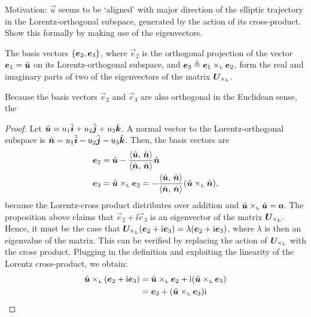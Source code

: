 Motivation: $\vec{u}$ seems to be `aligned' with major direction of the elliptic trajectory in the Lorentz-orthogonal subspace, generated by the action of its cross-product. Show this formally by making use of the eigenvectors.

The basis vectors $ \qty{\vec{e}_2, \vec{e}_3}$, where $\vec{e}_2$ is the orthogonal projection of the vector $\vec{e}_1 = \uvec{u}$ on its Lorentz-orthogonal subspace, and $\vec{e}_3 \triangleq \lorcrossp{\vec{e}_1}{\vec{e}_2}$, form the real and imaginary parts of two of the eigenvectors of the matrix $\mat{U}_{\lorcrossp{}{}}$. 

Because the basis vectors $\vec{e}_2$ and $\vec{e}_3$ are also orthogonal in the Euclidean sense, the 

\begin{proof}
    Let $\uvec{u} = u_1\uvec{i} + u_2\uvec{j} + u_3\uvec{k}$. A normal vector to the Lorentz-orthogonal subspace is $
    \uvec{n} = u_1\uvec{i} - u_2\uvec{j} - u_3\uvec{k}$. Then, the basis vectors are
    \begin{equation}
        \begin{split}
            \vec{e}_2 &= 
            \uvec{u} - \frac{ \inner{\uvec{u}}{\uvec{n}} }{ \inner{\uvec{n}}{\uvec{n}} } \uvec{n} \\
            \vec{e}_3 &= \lorcrossp{\uvec{u}}{\vec{e}_2} = -\frac{ \inner{\uvec{u}}{\uvec{n}} }{ \inner{\uvec{n}}{\uvec{n}} } \qty(\lorcrossp{\uvec{u}}{\uvec{n}}),
        \end{split}
    \end{equation}
    because the Lorentz-cross product distributes over addition and $\lorcrossp{\uvec{u}}{\uvec{u}} = \vec{0}$. The proposition above claims that $\vec{e}_2 + \ii\vec{e}_3$ is an eigenvector of the matrix $\mat{U}_{\lorcrossp{}{}}$. Hence, it must be the case that $\mat{U}_{\lorcrossp{}{}}(\vec{e}_2 + \ii\vec{e}_3) = \lambda(\vec{e}_2 + \ii\vec{e}_3)$, where $\lambda$ is then an eigenvalue of the matrix. This can be verified by replacing the action of $\mat{U}_{\lorcrossp{}{}}$ with the cross product. Plugging in the definition and exploiting the linearity of the Lorentz cross-product, we obtain:
    \begin{equation*}
        \begin{split}
            \lorcrossp{\uvec{u}}{\qty(\vec{e}_2 + \ii\vec{e}_3)} 
            &= \lorcrossp{\uvec{u}}{\vec{e}_2} +
        \ii\qty(\lorcrossp{\uvec{u}}{\vec{e}_3}) \\
            &= \vec{e}_3 + \qty(\lorcrossp{\uvec{u}}{\vec{e}_3})\ii \\ 

\end{split}
\end{equation*}
\end{proof}
